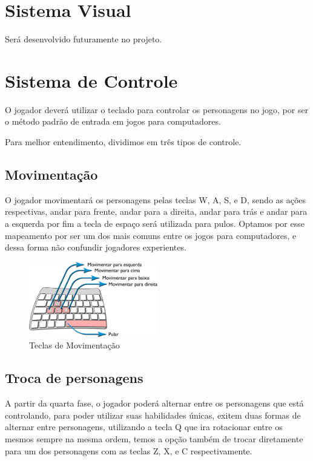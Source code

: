 
\section{Sistema Visual}
Será desenvolvido futuramente no projeto.


\section{Sistema de Controle}

O jogador deverá utilizar o teclado para controlar os personagens no jogo, por ser o método padrão de entrada em jogos para computadores. 

Para melhor entendimento, dividimos em três tipos de controle.

\subsection{Movimentação}

O jogador movimentará os personagens pelas teclas W, A, S, e D, sendo as ações respectivas, andar para frente, andar para a direita, andar para trás e andar para a esquerda por fim a tecla de espaço será utilizada para pulos. Optamos por esse mapeamento por ser um dos mais comuns entre os jogos para computadores, e dessa forma não confundir jogadores experientes.

\begin{figure}[!htb] \caption{\label{fig_tacladoMov}Teclas de Movimentação} \begin{center}
\includegraphics[width=0.5\textwidth]{imagens/tecladoMov.png} \end{center}
 \end{figure}


\subsection{Troca de personagens}

A partir da quarta fase, o jogador poderá alternar entre os personagens que está controlando, para poder utilizar suas habilidades únicas, exitem duas formas de alternar entre personagens, utilizando a tecla Q que ira rotacionar entre os mesmos sempre na mesma ordem, temos a opção também de trocar diretamente para um dos personagens com as teclas Z, X, e C respectivamente.


